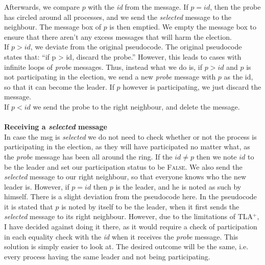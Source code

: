 \documentclass{report}
\begin{document}
Afterwards, we compare $p$ with the \textit{id} from the message.
If $p = id$, then the probe has circled around all processes, and we send the \textit{selected} message to the neighbour. The message box of $p$ is then emptied. We empty the message box to ensure that there aren't any excess messages that will harm the election.\\
If $p > id$, we deviate from the original pseudocode. The original pseudocode states that: ``if p > id, discard the probe.'' However, this leads to cases with infinite loops of \textit{probe} messages. Thus, instead what we do is, if $p > id$ and $p$ is not participating in the election, we send a new \textit{probe} message with $p$ as the id, so that it can become the leader. If $p$ however is participating, we just discard the message.\\
If $p < id$ we send the probe to the right  neighbour, and delete the message.
\\\\
\noindent
\textbf{Receiving a \textit{selected} message}\\
\noindent
In case the msg is \textit{selected} we do not need to check whether or not the process is participating in the election, as they will have participated no matter what, as the \textit{probe} message has been all around the ring. If the $id \neq p$ then we note $id$ to be the leader and set our participation status to be \textsc{False}. We also send the \textit{selected} message to our right neighbour, so that everyone knows who the new leader is. However, if $p = id$ then $p$ is the leader, and he is noted as such by himself. There is a slight deviation from the pseudocode here. In the pseudocode it is stated that $p$ is noted by itself to be the leader, when it first sends the \textit{selected} message to its right neighbour. However, due to the limitations of TLA$^{+}$, I have decided against doing it there, as it would require a check of participation in each equality check with the \textit{id} when it receives the \textit{probe} message. This solution is simply easier to look at. The desired outcome will be the same, i.e. every process having the same leader and not being participating.
\end{document}
